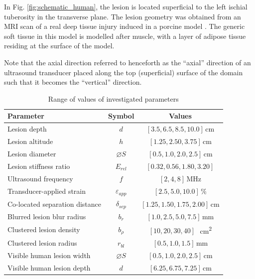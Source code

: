 		In Fig. \ref{fig:schematic_human}, the lesion is located superficial to the left ischial tuberosity in the transverse plane. The lesion geometry was obtained from an MRI scan of a real deep tissue injury induced in a porcine model \cite{solis13}. The generic soft tissue in this model is modelled after muscle, with a layer of adipose tissue residing at the surface of the model.

		Note that the axial direction referred to henceforth as the ``axial'' direction of an ultrasound transducer placed along the top (superficial) surface of the domain such that it becomes the ``vertical'' direction.

		\begin{table}[!t]
			\centering
			\caption[Quasi-static model investigated parameters]{Range of values of investigated parameters}
			\label{tab:quasi-parametervalues}
			\begin{tabular}{lcc}
				\toprule
				Parameter & Symbol & Values \\
				\midrule
				Lesion depth & $d$ & $[3.5, 6.5, 8.5, 10.0]$\,\si{\cm} \\
				Lesion altitude & $h$ & $[1.25, 2.50, 3.75]$\,\si{\cm} \\
				Lesion diameter & $\diameter S$ & $[0.5, 1.0, 2.0, 2.5]$\,\si{\cm} \\
				Lesion stiffness ratio & $E_{rel}$ & $[0.32, 0.56, 1.80, 3.20]$ \\
				Ultrasound frequency & $f$ & $[2, 4, 8]$\,\si{\MHz} \\
				Transducer-applied strain & $\varepsilon_{app}$ & $[2.5, 5.0, 10.0]$\,\si{\percent} \\
				Co-located separation distance & $\delta_{sep}$ & $[1.25, 1.50, 1.75, 2.00]$\,\si{\cm} \\
				Blurred lesion blur radius & $b_r$ & $[1.0, 2.5, 5.0, 7.5]$\,\si{\mm} \\
				Clustered lesion density & $b_\rho$ & $[10, 20, 30, 40]$\,\si{\per\cm\squared} \\
				Clustered lesion radius & $r_{bl}$ & $[0.5, 1.0, 1.5]$\,\si{\mm} \\
				Visible human lesion width & $\diameter S$ & $[0.5, 1.0, 2.0, 2.5]$\,\si{\cm} \\
				Visible human lesion depth & $d$ & $[6.25, 6.75, 7.25]$\,\si{\cm} \\
				\bottomrule
			\end{tabular}
		\end{table}

